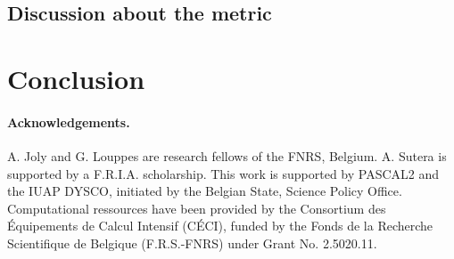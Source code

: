 \documentclass[wcp]{jmlr}
\begin{document}
\subsection{Discussion about the metric}
\label{sec:metric}


\section{Conclusion}

\begin{scriptsize}
\paragraph{Acknowledgements.} A. Joly and G. Louppes are research
fellows of the FNRS, Belgium.  A. Sutera is supported by a F.R.I.A. scholarship.
This work is supported by PASCAL2 and the IUAP
DYSCO, initiated by the Belgian State, Science Policy Office.
Computational ressources have been provided by the Consortium des Équipements
de Calcul Intensif (CÉCI), funded by the Fonds de la Recherche Scientifique de
Belgique (F.R.S.-FNRS) under Grant No. 2.5020.11.
\end{scriptsize}


\end{document}
